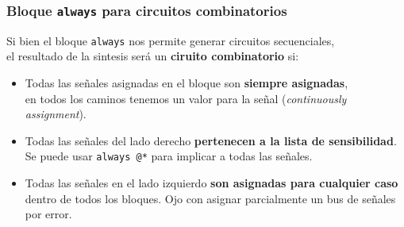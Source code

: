 \documentclass[aspectratio=169]{beamer}
\begin{document}
\begin{frame}[fragile,t]
    \frametitle{Bloque \texttt{always} para circuitos combinatorios}
    Si bien el bloque \texttt{always} nos permite generar circuitos secuenciales,\\
    \textcolor{verdeuca}{el resultado de la sintesis será un \textbf{ciruito combinatorio} si:}\\
    \bigskip
    \begin{itemize}
    \setlength\itemsep{0.5cm}
    \item<2-> Todas las señales asignadas en el bloque son \textbf{siempre asignadas},\\
    en todos los caminos tenemos un valor para la señal (\emph{continuously assignment}).
    \item<3-> Todas las señales del lado derecho \textbf{pertenecen a la lista de sensibilidad}.\\
    Se puede usar \texttt{always @*} para implicar a todas las señales.
    \item<4-> Todas las señales en el lado izquierdo \textbf{son asignadas para cualquier caso} dentro de todos los bloques.
    Ojo con asignar parcialmente un bus de señales por error.
    \end{itemize}
    \bigskip
\end{frame}
\end{document}

